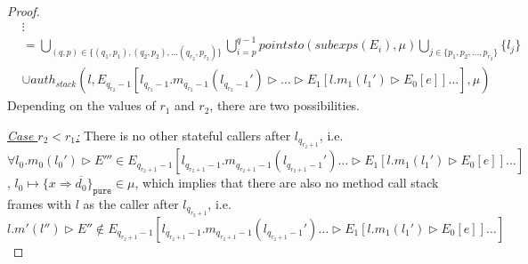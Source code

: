 \documentclass{llncs}
\newcommand{\keywadj}[1]{\mathtt{#1}}
\begin{document}
\begin{proof}
\begin{align*}
&\vdots\\
&=  \bigcup_{(q, p) \in \{ (q_1, p_1), (q_2, p_2), \dots (q_{r_2}, p_{r_2}) \}} \bigcup^{q-1}_{i = p} pointsto(subexps(E_i), \mu) \bigcup_{j \in \{ p_1, p_2, \dots, p_{r_2} \}} \{ l_j \} \\
&\cup auth_{stack}(l, E_{q_{r_2}-1}[l_{q_{r_2}-1}.m_{q_{r_2}-1}(l_{q_{r_2}-1}') \rhd \dots \rhd E_1[l.m_1(l_1') \rhd E_0[e]] \dots ], \mu)
\end{align*}
Depending on the values of $r_1$ and $r_2$, there are two possibilities.

\noindent\underline{\textit{Case $r_2 < r_1$:}} There is no other stateful callers after $l_{q_{r_2+1}}$, i.e.\\
$\forall l_0.m_0(l_0') \rhd E''' \in E_{q_{r_2+1}-1}[l_{q_{r_2+1}-1}.m_{q_{r_2+1}-1}(l_{q_{r_2+1}-1}')  \dots \rhd E_1[l.m_1(l_1') \rhd E_0[e]] \dots ]$, \mbox{$l_0 \mapsto \{ x \Rightarrow \overline{d_0} \}_{\keywadj{pure}} \in \mu$}, which implies that there are also no method call stack frames with $l$ as the caller after $l_{q_{r_2+1}}$, i.e.\\
$l.m'(l'') \rhd E'' \not\in E_{q_{r_2+1}-1}[l_{q_{r_2+1}-1}.m_{q_{r_2+1}-1}(l_{q_{r_2+1}-1}')  \dots \rhd E_1[l.m_1(l_1') \rhd E_0[e]] \dots ]$\\


\end{proof}
\end{document}
